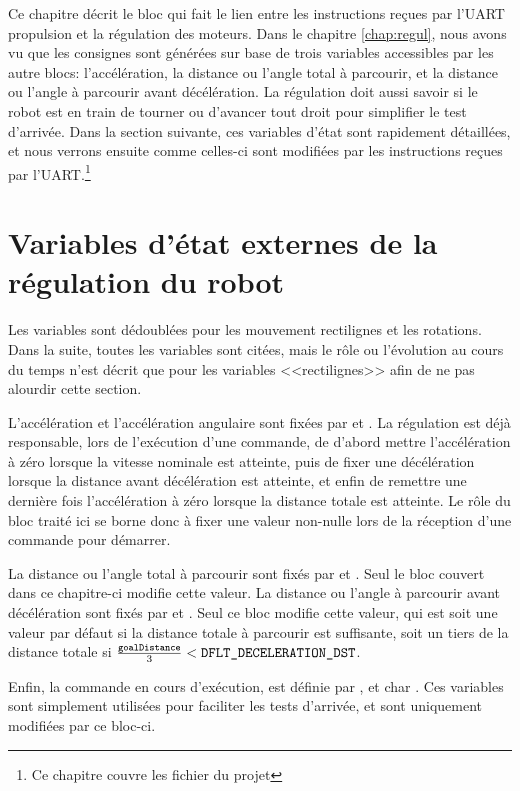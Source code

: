 Ce chapitre décrit le bloc qui fait le lien entre les instructions reçues par l'UART propulsion et la régulation des moteurs. Dans le chapitre \ref{chap:regul}, nous avons vu que les consignes sont générées sur base de trois variables accessibles par les autre blocs: l'accélération, la distance ou l'angle total à parcourir, et la distance ou l'angle à parcourir avant décélération. La régulation doit aussi savoir si le robot est en train de tourner ou d'avancer tout droit pour simplifier le test d'arrivée. Dans la section suivante, ces variables d'état sont rapidement détaillées, et nous verrons ensuite comme celles-ci sont modifiées par les instructions reçues par l'UART.\footnote{Ce chapitre couvre les fichier  du projet }

\section{Variables d'état externes de la régulation du robot\label{sec:stateVars}}
Les variables sont dédoublées pour les mouvement rectilignes et les rotations. Dans la suite, toutes les variables sont citées, mais le rôle ou l'évolution au cours du temps n'est décrit que pour les variables <<rectilignes>> afin de ne pas alourdir cette section.

L'accélération et l'accélération angulaire sont fixées par  et . La régulation est déjà responsable, lors de l'exécution d'une commande, de d'abord mettre l'accélération à zéro lorsque la vitesse nominale est atteinte, puis de fixer une décélération lorsque la distance avant décélération est atteinte, et enfin de remettre une dernière fois l'accélération à zéro lorsque la distance totale est atteinte. Le rôle du bloc traité ici se borne donc à fixer une valeur non-nulle lors de la réception d'une commande pour démarrer.

La distance ou l'angle total à parcourir sont fixés par  et . Seul le bloc couvert dans ce chapitre-ci modifie cette valeur. La distance ou l'angle à parcourir avant décélération sont fixés par  et . Seul ce bloc modifie cette valeur, qui est soit une valeur par défaut si la distance totale à parcourir est suffisante, soit un tiers de la distance totale si $\frac{\text{\texttt{goalDistance}}}{3}<\text{\texttt{DFLT\_DECELERATION\_DST}}$.

Enfin, la commande en cours d'exécution, est définie par , et char . Ces variables sont simplement utilisées pour faciliter les tests d'arrivée, et sont uniquement modifiées par ce bloc-ci.


